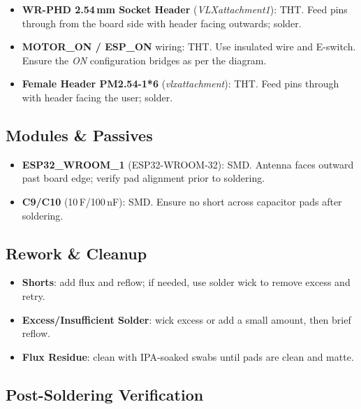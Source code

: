 \begin{itemize}
  \item \textbf{WR-PHD 2.54\,mm Socket Header} (\textit{VLXattachment1}): THT. Feed pins through from the board side with header facing outwards; solder.
  \item \textbf{MOTOR\_ON / ESP\_ON} wiring: THT. Use insulated wire and E-switch. Ensure the \emph{ON} configuration bridges as per the diagram.
  \item \textbf{Female Header PM2.54-1*6} (\textit{vlxattachment}): THT. Feed pins through with header facing the user; solder.
\end{itemize}

\subsection*{Modules \& Passives}
\begin{itemize}
  \item \textbf{ESP32\_WROOM\_1} (ESP32-WROOM-32): SMD. Antenna faces outward past board edge; verify pad alignment prior to soldering.
  \item \textbf{C9/C10} (10\,\textmu F/100\,nF): SMD. Ensure no short across capacitor pads after soldering.
\end{itemize}

\subsection*{Rework \& Cleanup}
\begin{itemize}
  \item \textbf{Shorts}: add flux and reflow; if needed, use solder wick to remove excess and retry.
  \item \textbf{Excess/Insufficient Solder}: wick excess or add a small amount, then brief reflow.
  \item \textbf{Flux Residue}: clean with IPA-soaked swabs until pads are clean and matte.
\end{itemize}

\subsection*{Post-Soldering Verification}

